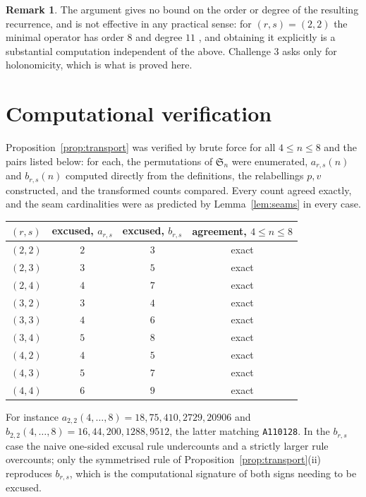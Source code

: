 \documentclass[11pt]{article}
\theoremstyle{definition}
\newtheorem{remark}[theorem]{Remark}
\newcommand{\Sn}{\mathfrak{S}_n}
\newcommand{\ars}{a_{r,s}}
\newcommand{\brs}{b_{r,s}}
\begin{document}
\begin{remark}
The argument gives no bound on the order or degree of the resulting recurrence,
and is not effective in any practical sense: for $(r,s)=(2,2)$ the minimal
operator has order $8$ and degree $11$ \cite{KK}, and obtaining it explicitly is
a substantial computation independent of the above. Challenge 3 asks only for
holonomicity, which is what is proved here.
\end{remark}

\section{Computational verification}\label{sec:ver}

Proposition~\ref{prop:transport} was verified by brute force for all
$4\le n\le 8$ and the pairs listed below: for each, the permutations of $\Sn$
were enumerated, $\ars(n)$ and $\brs(n)$ computed directly from the
definitions, the relabellings $p,v$ constructed, and the transformed counts
compared. Every count agreed exactly, and the seam cardinalities were as
predicted by Lemma~\ref{lem:seams} in every case.

\begin{center}
\begin{tabular}{lccc}
\toprule
$(r,s)$ & excused, $\ars$ & excused, $\brs$ & agreement, $4\le n\le 8$\\
\midrule
$(2,2)$ & $2$ & $3$ & exact \\
$(2,3)$ & $3$ & $5$ & exact \\
$(2,4)$ & $4$ & $7$ & exact \\
$(3,2)$ & $3$ & $4$ & exact \\
$(3,3)$ & $4$ & $6$ & exact \\
$(3,4)$ & $5$ & $8$ & exact \\
$(4,2)$ & $4$ & $5$ & exact \\
$(4,3)$ & $5$ & $7$ & exact \\
$(4,4)$ & $6$ & $9$ & exact \\
\bottomrule
\end{tabular}
\end{center}

For instance $a_{2,2}(4,\dots,8) = 18, 75, 410, 2729, 20906$ and
$b_{2,2}(4,\dots,8) = 16, 44, 200, 1288, 9512$, the latter matching
\texttt{A110128}. In the $\brs$ case the naive one-sided excusal rule
undercounts and a strictly larger rule overcounts; only the symmetrised rule of
Proposition~\ref{prop:transport}(ii) reproduces $\brs$, which is the
computational signature of both signs needing to be excused.
\end{document}
